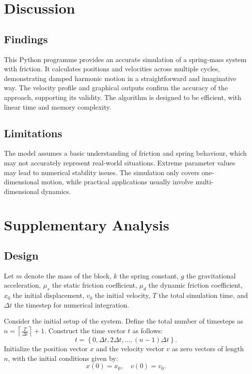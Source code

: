 \documentclass[12pt, a4paper, oneside]{report}
\begin{document}
\chapter{Discussion}

\section{Findings}

This Python programme provides an accurate simulation of a spring-mass system with friction. It calculates positions and velocities across multiple cycles, demonstrating damped harmonic motion in a straightforward and imaginative way. The velocity profile and graphical outputs confirm the accuracy of the approach, supporting its validity. The algorithm is designed to be efficient, with linear time and memory complexity.


\section{Limitations}

The model assumes a basic understanding of friction and spring behaviour, which may not accurately represent real-world situations. Extreme parameter values may lead to numerical stability issues. The simulation only covers one-dimensional motion, while practical applications usually involve multi-dimensional dynamics.



\chapter{Supplementary Analysis}

\section{Design}

Let \( m \) denote the mass of the block, \( k \) the spring constant, \( g \) the gravitational acceleration, \( \mu_s \) the static friction coefficient, \( \mu_d \) the dynamic friction coefficient, \( x_0 \) the initial displacement, \( v_0 \) the initial velocity, \( T \) the total simulation time, and \( \Delta t \) the timestep for numerical integration.

Consider the initial setup of the system. Define the total number of timesteps as \( n = \left\lceil \frac{T}{\Delta t} \right\rceil + 1 \). Construct the time vector \( t \) as follows:
\[
	t = \left\{ 0, \Delta t, 2\Delta t, \ldots, (n-1)\Delta t \right\}.
\]
Initialize the position vector \( x \) and the velocity vector \( v \) as zero vectors of length \( n \), with the initial conditions given by:
\[
	x(0) = x_0, \quad v(0) = v_0.
\]
\end{document}
